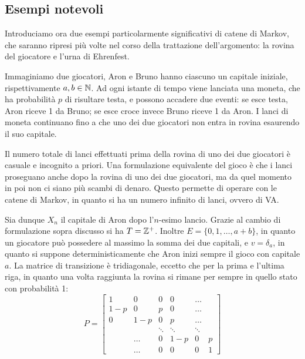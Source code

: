 \subsection{Esempi notevoli}\label{rovina-gioc}
	Introduciamo ora due esempi particolarmente significativi di catene di Markov, che saranno ripresi più volte nel corso della trattazione dell'argomento: la rovina del giocatore e l'urna di Ehrenfest.
	\begin{ese} 
		Immaginiamo due giocatori, Aron e Bruno hanno ciascuno un capitale iniziale, rispettivamente $a, b \in \mathbb N$.
		Ad ogni istante di tempo viene lanciata una moneta, che ha probabilità $p$ di risultare testa, e possono accadere due eventi: se esce testa, Aron riceve 1 da Bruno; se esce croce invece Bruno riceve 1 da Aron.
		I lanci di moneta continuano fino a che uno dei due giocatori non entra in rovina esaurendo il suo capitale.
		
		Il numero totale di lanci effettuati prima della rovina di uno dei due giocatori è casuale e incognito a priori.
		Una formulazione equivalente del gioco è che i lanci proseguano anche dopo la rovina di uno dei due giocatori, ma da quel momento in poi non ci siano più scambi di denaro.
		Questo permette di operare con le catene di Markov, in quanto si ha un numero infinito di lanci, ovvero di VA.
		
		Sia dunque $X_n$ il capitale di Aron dopo l'$n$-esimo lancio.
		Grazie al cambio di formulazione sopra discusso si ha $T = \mathbb Z^+$.
		Inoltre $E = \{0,1,\dots,a+b\}$, in quanto un giocatore può possedere al massimo la somma dei due capitali,
		e $v = \delta_a$, in quanto si suppone deterministicamente che Aron inizi sempre il gioco con capitale $a$.
		La matrice di transizione è tridiagonale, eccetto che per la prima e l'ultima riga, in quanto una volta raggiunta la rovina si rimane per sempre in quello stato con probabilità 1:
		$$P = \begin{bmatrix}
		1   & 0 & 0 & 0 & \dots \\
		1-p & 0 & p & 0 & \dots \\
		0 & 1-p & 0 & p & \dots \\
		&& \ddots & \ddots & \ddots \\
		& \dots & 0 & 1-p & 0 & p \\
		& \dots & 0 & 0 & 0 & 1
		\end{bmatrix}$$
		

\end{ese}
